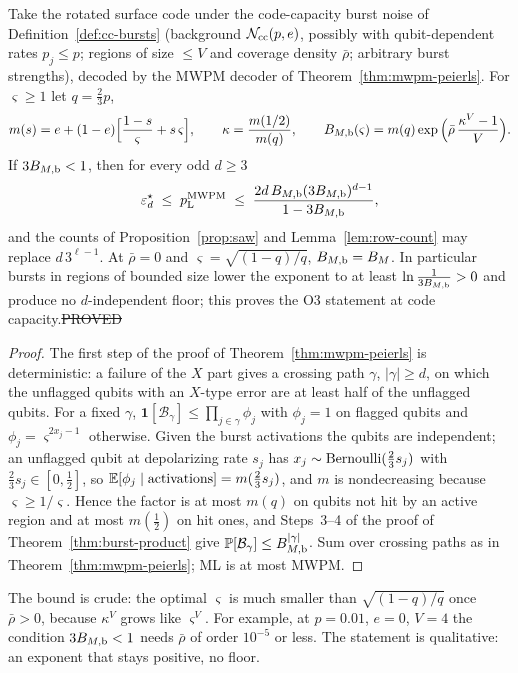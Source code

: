 \begin{theorem}\label{thm:peierls-bursts}
Take the rotated surface code under the code-capacity burst noise of Definition~\ref{def:cc-bursts} (background $\mathcal{N}_{\rm cc}(p,e)$, possibly with qubit-dependent rates $p_j\le p$; regions of size $\le V$ and coverage density $\bar\rho$; arbitrary burst strengths), decoded by the MWPM decoder of Theorem~\ref{thm:mwpm-peierls}. For $\varsigma\ge1$ let $q=\tfrac23p$,
\[
m(s)=e+(1-e)\Big[\frac{1-s}{\varsigma}+s\,\varsigma\Big],\qquad\kappa=\frac{m(1/2)}{m(q)},\qquad B_{M,\rm b}(\varsigma)=m(q)\exp\Big(\bar\rho\,\frac{\kappa^V-1}V\Big).
\]
If $3B_{M,\rm b}<1$, then for every odd $d\ge3$
\[
\varepsilon^{\star}_d\;\le\;p_{\mathrm{L}}^{\rm MWPM}\;\le\;\frac{2d\,B_{M,\rm b}(3B_{M,\rm b})^{d-1}}{1-3B_{M,\rm b}},
\]
and the counts of Proposition~\ref{prop:saw} and Lemma~\ref{lem:row-count} may replace $d\,3^{\ell-1}$. At $\bar\rho=0$ and $\varsigma=\sqrt{(1-q)/q}$, $B_{M,\rm b}=B_M$. In particular bursts in regions of bounded size lower the exponent to at least $\ln\frac1{3B_{M,\rm b}}>0$ and produce no $d$-independent floor; this proves the O3 statement at code capacity.\hfill\st{PROVED}
\end{theorem}
\begin{proof}
The first step of the proof of Theorem~\ref{thm:mwpm-peierls} is deterministic: a failure of the $X$ part gives a crossing path $\gamma$, $|\gamma|\ge d$, on which the unflagged qubits with an $X$-type error are at least half of the unflagged qubits. For a fixed $\gamma$, $\mathbf 1[\mathcal B_\gamma]\le\prod_{j\in\gamma}\phi_j$ with $\phi_j=1$ on flagged qubits and $\phi_j=\varsigma^{2x_j-1}$ otherwise. Given the burst activations the qubits are independent; an unflagged qubit at depolarizing rate $s_j$ has $x_j\sim{\rm Bernoulli}(\tfrac23s_j)$ with $\tfrac23s_j\in[0,\tfrac12]$, so $\mathbb{E}[\phi_j\mid\text{activations}]=m(\tfrac23s_j)$, and $m$ is nondecreasing because $\varsigma\ge1/\varsigma$. Hence the factor is at most $m(q)$ on qubits not hit by an active region and at most $m(\tfrac12)$ on hit ones, and Steps~3--4 of the proof of Theorem~\ref{thm:burst-product} give $\mathbb{P}[\mathcal B_\gamma]\le B_{M,\rm b}^{|\gamma|}$. Sum over crossing paths as in Theorem~\ref{thm:mwpm-peierls}; ML is at most MWPM.
\end{proof}

\noindent The bound is crude: the optimal $\varsigma$ is much smaller than $\sqrt{(1-q)/q}$ once $\bar\rho>0$, because $\kappa^V$ grows like $\varsigma^V$. For example, at $p=0.01$, $e=0$, $V=4$ the condition $3B_{M,\rm b}<1$ needs $\bar\rho$ of order $10^{-5}$ or less. The statement is qualitative: an exponent that stays positive, no floor.


